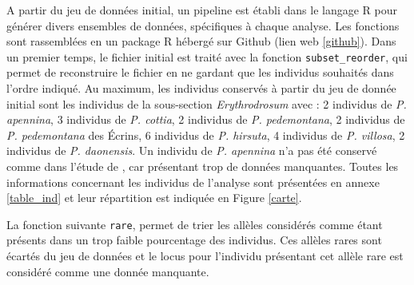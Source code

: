 \documentclass[../Master_report2.tex]{subfiles}
\begin{document}
A partir du jeu de données initial, un pipeline est établi dans le langage R \citep{RTeam2017} pour générer divers ensembles de données, spécifiques à chaque analyse. Les fonctions sont rassemblées en un package R hébergé sur Github (lien web \ref{github}). Dans un premier temps, le fichier initial est traité avec la fonction \verb|subset_reorder|, qui permet de reconstruire le fichier en ne gardant que les individus souhaités dans l'ordre indiqué. Au maximum, les individus conservés à partir du jeu de donnée initial sont les individus de la sous-section \textit{Erythrodrosum} avec :
2 individus de \textit{P. apennina}, 
3 individus de \textit{P. cottia}, 
2 individus de \textit{P. pedemontana}, 
2 individus de \textit{P. pedemontana} des Écrins, 
6 individus de \textit{P. hirsuta}, 
4 individus de \textit{P. villosa}, 
2 individus de \textit{P. daonensis}.
Un individu de \textit{P. apennina} n'a pas été conservé comme dans l'étude de \citet{Boucher2016a}, car présentant trop de données manquantes. Toutes les informations concernant les individus de l'analyse sont présentées en annexe \ref{table_ind} et leur répartition est indiquée en Figure \ref{carte}.

La fonction suivante \verb|rare|, permet de trier les allèles considérés comme étant présents dans un trop faible pourcentage des individus. Ces allèles rares sont écartés du jeu de données et le locus pour l'individu présentant cet allèle rare est considéré comme une donnée manquante.

\end{document}
